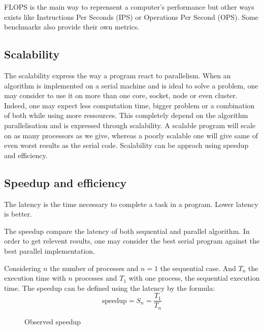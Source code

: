 FLOPS is the main way to reprensent a computer's performance but other ways exists like Instructions Per Seconds (IPS) or Operations Per Second (OPS).
Some benchmarks also provide their own metrics. 

\subsection{Scalability}
The scalability express the way a program react to parallelism. 
When an algorithm is implemented on a serial machine and is ideal to solve a problem, one may consider to use it on more than one core, socket, node or even cluster. 
Indeed, one may expect less computation time, bigger problem or a combination of both while using more ressources. 
This completely depend on the algorithm parallelisation and is expressed through scalability. 
A scalable program will scale on as many processors as we give, whereas a poorly scalable one will give same of even worst results as the serial code.  
Scalability can be approch using speedup and efficiency.

\subsection{Speedup and efficiency}
The latency is the time necessary to complete a task in a program.
Lower latency is better. 

The speedup compare the latency of both sequential and parallel algorithm. 
In order to get relevent results, one may consider the best serial program against the best parallel implementation.

Considering $n$ the number of processes and $n=1$ the sequential case.
And $T_n$ the execution time with $n$ processes and $T_1$ with one process, the sequential execution time. 
The speedup can be defined using the latency by the formula: 
\begin{equation}
\text{speedup} = S_n =  \frac{T_1}{T_n}
\end{equation}


\begin{figure}
\centering 
{}
\caption{Observed speedup}
\label{fig:1_HPC:speedup_obs}
\end{figure}

